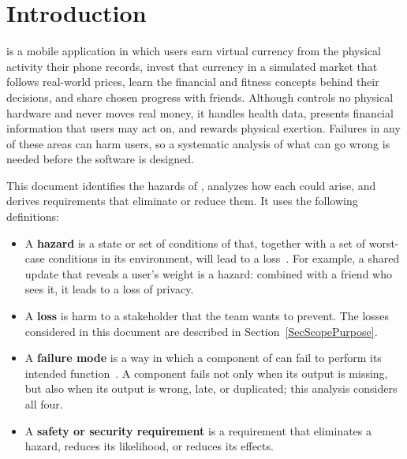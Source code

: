 \documentclass{article}
\begin{document}

\section{Introduction} \label{SecIntro}


\progname{} is a mobile application in which users earn virtual currency from
the physical activity their phone records, invest that currency in a simulated
market that follows real-world prices, learn the financial and fitness concepts
behind their decisions, and share chosen progress with friends. Although
\progname{} controls no physical hardware and never moves real money, it
handles health data, presents financial information that users may act on, and
rewards physical exertion. Failures in any of these areas can harm users, so a
systematic analysis of what can go wrong is needed before the software is
designed.

This document identifies the hazards of \progname{}, analyzes how each could
arise, and derives requirements that eliminate or reduce them. It uses the
following definitions:

\begin{itemize}
  \item A \textbf{hazard} is a state or set of conditions of \progname{} that,
        together with a set of worst-case conditions in its environment, will lead to
        a loss~\cite{Leveson2011}. For example, a
        shared update that reveals a user's weight is a hazard: combined with a
        friend who sees it, it leads to a loss of privacy.
  \item A \textbf{loss} is harm to a stakeholder that the team wants to prevent.
        The losses considered in this document are described in
        Section~\ref{SecScopePurpose}.
  \item A \textbf{failure mode} is a way in which a component of \progname{} can
        fail to perform its intended function~\cite{IEC60812}. A component fails not
        only when its output is missing, but also when its output is wrong, late, or
        duplicated; this analysis considers all four.
  \item A \textbf{safety or security requirement} is a requirement that
        eliminates a hazard, reduces its likelihood, or reduces its effects.
\end{itemize}
\end{document}
